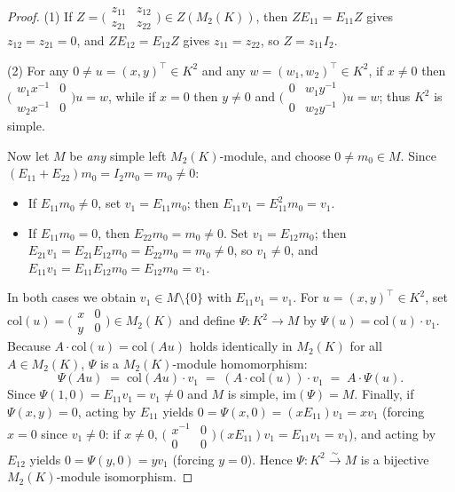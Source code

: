 \documentclass[11pt,a4paper]{article}
\theoremstyle{plain}
\theoremstyle{definition}
\newcommand{\Mat}{M}
\begin{document}
\begin{proof}
(1) If $Z = \bigl(\begin{smallmatrix}z_{11}&z_{12}\\z_{21}&z_{22}\end{smallmatrix}\bigr) \in Z(\Mat_2(K))$, then $Z E_{11} = E_{11} Z$ gives $z_{12} = z_{21} = 0$, and $Z E_{12} = E_{12} Z$ gives $z_{11} = z_{22}$, so $Z = z_{11} I_2$.

(2) For any $0 \neq u = (x,y)^\top \in K^2$ and any $w = (w_1,w_2)^\top \in K^2$, if $x \neq 0$ then $\bigl(\begin{smallmatrix}w_1 x^{-1} & 0\\ w_2 x^{-1} & 0\end{smallmatrix}\bigr) u = w$, while if $x = 0$ then $y \neq 0$ and $\bigl(\begin{smallmatrix}0 & w_1 y^{-1}\\ 0 & w_2 y^{-1}\end{smallmatrix}\bigr) u = w$; thus $K^2$ is simple.

Now let $M$ be \emph{any} simple left $\Mat_2(K)$-module, and choose $0 \neq m_0 \in M$. Since $(E_{11} + E_{22}) m_0 = I_2 m_0 = m_0 \neq 0$:
\begin{itemize}
  \item If $E_{11} m_0 \neq 0$, set $v_1 = E_{11} m_0$; then $E_{11} v_1 = E_{11}^2 m_0 = v_1$.
  \item If $E_{11} m_0 = 0$, then $E_{22} m_0 = m_0 \neq 0$. Set $v_1 = E_{12} m_0$; then $E_{21} v_1 = E_{21} E_{12} m_0 = E_{22} m_0 = m_0 \neq 0$, so $v_1 \neq 0$, and $E_{11} v_1 = E_{11} E_{12} m_0 = E_{12} m_0 = v_1$.
\end{itemize}
In both cases we obtain $v_1 \in M \setminus \{0\}$ with $E_{11} v_1 = v_1$. For $u = (x,y)^\top \in K^2$, set $\mathrm{col}(u) = \bigl(\begin{smallmatrix}x & 0\\ y & 0\end{smallmatrix}\bigr) \in \Mat_2(K)$ and define $\Psi : K^2 \to M$ by $\Psi(u) = \mathrm{col}(u) \cdot v_1$. Because $A \cdot \mathrm{col}(u) = \mathrm{col}(A u)$ holds identically in $\Mat_2(K)$ for all $A \in \Mat_2(K)$, $\Psi$ is a $\Mat_2(K)$-module homomorphism:
\[
  \Psi(A u) \;=\; \mathrm{col}(A u)\cdot v_1 \;=\; (A \cdot \mathrm{col}(u)) \cdot v_1 \;=\; A \cdot \Psi(u).
\]
Since $\Psi(1,0) = E_{11} v_1 = v_1 \neq 0$ and $M$ is simple, $\mathrm{im}(\Psi) = M$. Finally, if $\Psi(x,y) = 0$, acting by $E_{11}$ yields $0 = \Psi(x,0) = (x E_{11}) v_1 = x v_1$ (forcing $x=0$ since $v_1 \neq 0$: if $x \neq 0$, $\bigl(\begin{smallmatrix}x^{-1}&0\\0&0\end{smallmatrix}\bigr)(x E_{11}) v_1 = E_{11} v_1 = v_1$), and acting by $E_{12}$ yields $0 = \Psi(y,0) = y v_1$ (forcing $y=0$). Hence $\Psi : K^2 \xrightarrow{\sim} M$ is a bijective $\Mat_2(K)$-module isomorphism.
\end{proof}
\end{document}
